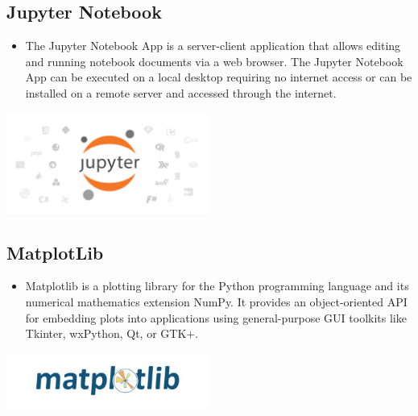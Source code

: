 \subsection{Jupyter Notebook}
\begin{minipage}{0.4\textwidth}
\begin{itemize}
\item[\textbf{\emph{}}] 
The Jupyter Notebook App is a server-client application that allows editing and running notebook documents via a web browser. The Jupyter Notebook App can be executed on a local desktop requiring no internet access or can be installed on a remote server and accessed through the internet.\cite{ref46}
\end{itemize}
\end{minipage}%
%
\begin{minipage}{0.4\textwidth}
\begin{center}
    \includegraphics[width=0.5\textwidth]{images/jupyter_notebook}
    \label{img:g}
\end{center}
\end{minipage}






\subsection{MatplotLib}
\begin{minipage}{0.4\textwidth}
\begin{itemize}
\item[\textbf{\emph{}}] 
Matplotlib is a plotting library for the Python programming language and its numerical mathematics extension NumPy. It provides an object-oriented API for embedding plots into applications using general-purpose GUI toolkits like Tkinter, wxPython, Qt, or GTK+.\cite{ref45}
\end{itemize}
\end{minipage}%
%
\begin{minipage}{0.4\textwidth}
\begin{center}
    \includegraphics[width=0.5\textwidth]{images/matplot_lib}
    \label{img:g}
\end{center}
\end{minipage}



